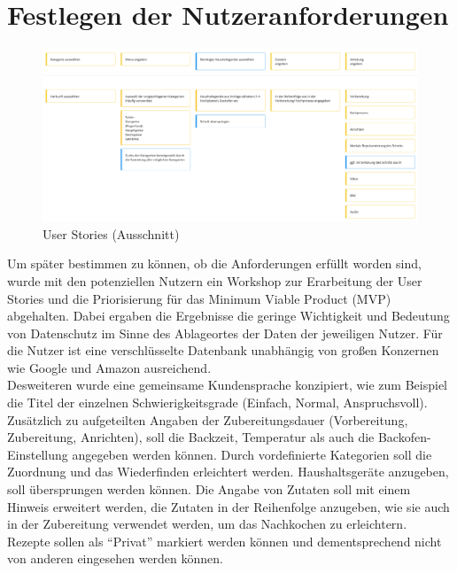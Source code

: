 \chapter{Festlegen der Nutzeranforderungen}
\label{sec:userstories}
\begin{figure}[h] %
    \includegraphics[width=1\textwidth]{images/userstories.png}
    \caption[User Stories (Ausschnitt)]{User Stories (Ausschnitt)}
    \label{fig:userstories}
\end{figure}
Um später bestimmen zu können, ob die Anforderungen erfüllt worden sind, wurde mit den potenziellen Nutzern ein Workshop zur Erarbeitung der User Stories und die Priorisierung für das Minimum Viable Product (MVP)\citep{Patton_2014} abgehalten. Dabei ergaben die Ergebnisse die geringe Wichtigkeit und Bedeutung von Datenschutz im Sinne des Ablageortes der Daten der jeweiligen Nutzer. Für die Nutzer ist eine verschlüsselte Datenbank unabhängig von großen Konzernen wie Google und Amazon ausreichend.\\ 

Desweiteren wurde eine gemeinsame Kundensprache konzipiert, wie zum Beispiel die Titel der einzelnen Schwierigkeitsgrade (Einfach, Normal, Anspruchsvoll). Zusätzlich zu aufgeteilten Angaben der Zubereitungsdauer (Vorbereitung, Zubereitung, Anrichten), soll die Backzeit, Temperatur als auch die Backofen-Einstellung angegeben werden können. Durch vordefinierte Kategorien soll die Zuordnung und das Wiederfinden erleichtert werden. Haushaltsgeräte anzugeben, soll übersprungen werden können. Die Angabe von Zutaten soll mit einem Hinweis erweitert werden, die Zutaten in der Reihenfolge anzugeben, wie sie auch in der Zubereitung verwendet werden, um das Nachkochen zu erleichtern. Rezepte sollen als {``Privat''} markiert werden können und dementsprechend nicht von anderen eingesehen werden können.\\ 

